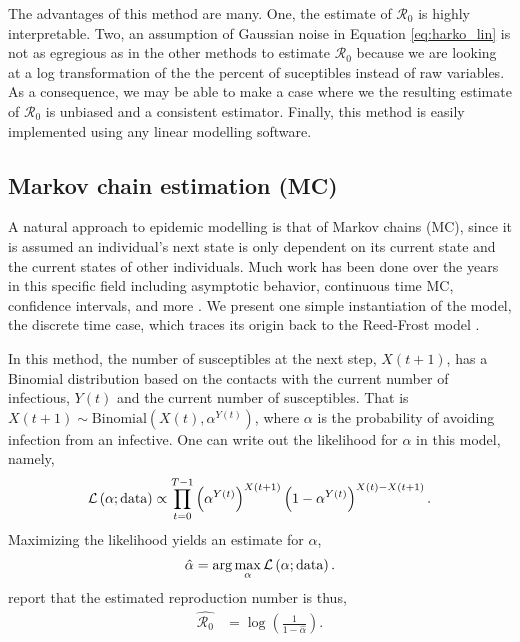 \documentclass[12pt]{article}
\newcommand{\rr}{\ensuremath{\mathcal{R}_0}}
\begin{document}
The advantages of this method are many.  One, the estimate of $\rr$ is highly interpretable.  Two, an assumption of Gaussian noise in Equation \ref{eq:harko_lin} is not as egregious as in the other methods to estimate $\rr$ because we are looking at a log transformation of the the percent of suceptibles instead of raw variables.  As a consequence, we may be able to make a case where we the resulting estimate of $\rr$ is unbiased and a consistent estimator.  Finally,  this method is easily implemented using any linear modelling software.  

\subsection{Markov chain estimation (MC)}
A natural approach to epidemic modelling is that of Markov chains (MC), since it is assumed an individual's next state is only dependent on its current state and the current states of other individuals.  Much work has been done over the years in this specific field including asymptotic behavior, continuous time MC, confidence intervals, and more \citep{jacquez1991,gani1995,daley2001epidemic}.  We present one simple instantiation of the model, the discrete time case, which traces its origin back to the Reed-Frost model \citep{abbey1952}.

In this method, the number of susceptibles at the next step, $X(t+1)$, has a Binomial distribution based on the contacts with the current number of infectious, $Y(t)$ and the current number of susceptibles.  That is $X(t+1) \sim \text{Binomial}\left(X(t), \alpha^{Y(t)}\right)$, where $\alpha$ is the probability of avoiding infection from an infective.  One can write out the likelihood for $\alpha$ in this model, namely,
\begin{align*}
\mathcal{L}\left ( \alpha ; \textnormal{data}\right ) \propto \prod_{t=0}^{T-1}\left ( \alpha^{Y(t)} \right )^{X(t+1)} \left (1- \alpha^{Y(t)} \right )^{X(t) - X(t+1)}.
\end{align*}
Maximizing the likelihood yields an estimate for $\alpha$,
\begin{align*}
\hat{\alpha} = \arg \max_{\alpha} \mathcal{L}\left(\alpha; \textnormal{data} \right ).
  \end{align*}
 \cite{barbour2004} report that the estimated reproduction number is thus,
\begin{align}\label{eq:r0-mc}
\hat{\rr} &= \log \left ( \frac{1}{1-\hat{\alpha}}\right ).
\end{align}
\end{document}
